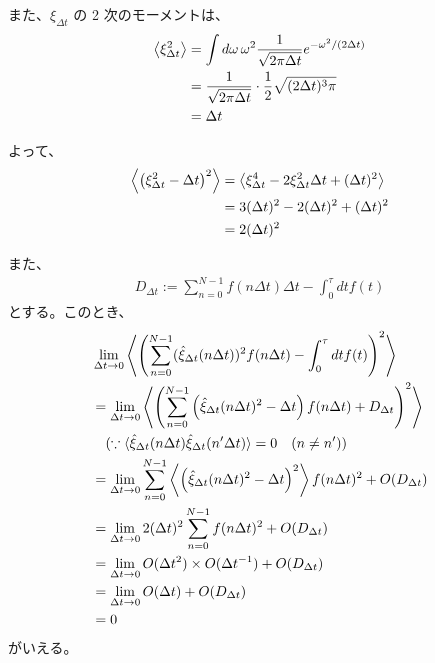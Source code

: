 \documentclass[a4paper,11pt]{jsarticle}
\numberwithin{equation}{section}
\begin{document}
また、$\xi_{\Delta t}$ の 2 次のモーメントは、
\begin{align}
\left\langle \xi_{\Delta t}^2 \right\rangle 
&= \int d\omega \, \omega^2 \frac{1}{\sqrt{2\pi \Delta t}} e^{-\omega^2/(2\Delta t)} \notag \\
&= \frac{1}{\sqrt{2\pi \Delta t}} \cdot \frac{1}{2} \sqrt{(2\Delta t)^3 \pi} \notag \\
&= \Delta t
\end{align}

よって、
\begin{align}
\left\langle \left( \xi_{\Delta t}^2 - \Delta t \right)^2 \right\rangle 
&= \left\langle \xi_{\Delta t}^4 - 2\xi_{\Delta t}^2 \Delta t + (\Delta t)^2 \right\rangle \notag \\
&= 3 (\Delta t)^2 - 2 (\Delta t)^2 + (\Delta t)^2 \notag \\
&= 2 (\Delta t)^2
\end{align}

また、
\begin{align}
  D_{\Delta t} := \sum_{n=0}^{N-1} f(n \Delta t) \Delta t - \int_0^{\tau} dt f(t)
\end{align}
とする。このとき、
\begin{align}
&\lim_{\Delta t \to 0} 
\left\langle 
\left( 
\sum_{n=0}^{N-1} (\hat{\xi}_{\Delta t}(n\Delta t))^2 f(n\Delta t) 
- \int_0^{\tau} dt f(t) 
\right)^2 
\right\rangle
\\
&= \lim_{\Delta t \to 0} 
\left\langle 
\left( 
\sum_{n=0}^{N-1} \left( \hat{\xi}_{\Delta t}(n\Delta t)^2 - \Delta t \right) f(n\Delta t) + D_{\Delta t}
\right)^2 
\right\rangle \notag \\
&\quad (\because \langle \hat{\xi}_{\Delta t}(n\Delta t) \hat{\xi}_{\Delta t}(n'\Delta t) \rangle = 0 \quad (n \ne n')) \notag \\
&= \lim_{\Delta t \to 0} 
\sum_{n=0}^{N-1} 
\left\langle 
\left( \hat{\xi}_{\Delta t}(n\Delta t)^2 - \Delta t \right)^2 
\right\rangle 
f(n\Delta t)^2 + O(D_{\Delta t}) \notag \\
&= \lim_{\Delta t \to 0} 
2 (\Delta t)^2 \sum_{n=0}^{N-1} f(n\Delta t)^2 + O(D_{\Delta t}) \notag \\
&= \lim_{\Delta t \to 0} 
O(\Delta t^2) \times O(\Delta t^{-1}) + O(D_{\Delta t}) \notag \\
&= \lim_{\Delta t \to 0} 
O(\Delta t) + O(D_{\Delta t}) \notag \\
&= 0
\end{align}
がいえる。
\end{document}

